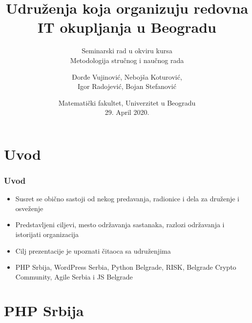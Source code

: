 \documentclass[hyperref={bookmarks=false},aspectratio=169]{beamer}
\title[]
{\bfseries{Udruženja koja organizuju redovna IT okupljanja u Beogradu}}
\subtitle{Seminarski rad u okviru kursa\\Metodologija stručnog i naučnog rada}
\author[]
{Đorđe Vujinović, Nebojša Koturović, \\Igor Radojević, Bojan Stefanović}
\date[ICUP, 2014]
{Matematički fakultet, Univerzitet u Beogradu\\29. April 2020.}
\begin{document}
\frame{\titlepage}  %


\section{Uvod}

\begin{frame}
\frametitle{Uvod}

\begin{itemize}
    \item Susret se obično sastoji od nekog predavanja, radionice i dela za druženje i osveženje
    \item Predstavljeni ciljevi, mesto održavanja sastanaka, razlozi održavanja i istorijati organizacija
    \item Cilj prezentacije je upoznati čitaoca sa udruženjima
    \item PHP Srbija, WordPress Serbia, Python Belgrade, RISK, Belgrade Crypto Community, Agile Serbia i JS Belgrade
\end{itemize}

\end{frame}

\section{PHP Srbija}
\end{document}
